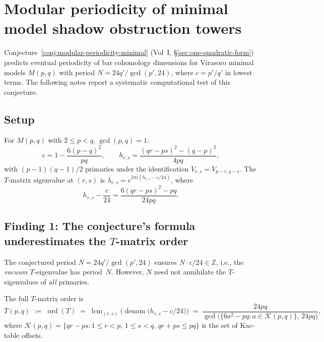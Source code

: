 \documentclass[11pt]{article}
\begin{document}
\section{Modular periodicity of minimal model shadow obstruction towers}
\label{sec:modular-periodicity-minimal-shadow}

Conjecture~\ref*{conj:modular-periodicity-minimal} (Vol~I,
\S\ref*{sec:one-quadratic-form}) predicts eventual periodicity
of bar cohomology dimensions for Virasoro minimal models
$M(p,q)$ with period $N = 24q'/\gcd(p',24)$, where
$c = p'/q'$ in lowest terms.  The following notes report a
systematic computational test of this conjecture.

\subsection*{Setup}

For $M(p,q)$ with $2 \le p < q$, $\gcd(p,q)=1$:
\[
c = 1 - \frac{6(p-q)^2}{pq}, \qquad
h_{r,s} = \frac{(qr-ps)^2 - (q-p)^2}{4pq},
\]
with $(p-1)(q-1)/2$ primaries under the identification
$V_{r,s} = V_{p-r,q-s}$.  The $T$-matrix eigenvalue at
$(r,s)$ is $\lambda_{r,s} = e^{2\pi i (h_{r,s} - c/24)}$,
where
\[
h_{r,s} - \frac{c}{24}
= \frac{6(qr-ps)^2 - pq}{24pq}.
\]

\subsection*{Finding 1: The conjecture's formula underestimates
  the $T$-matrix order}

The conjectured period $N = 24q'/\gcd(p',24)$ ensures
$N \cdot c/24 \in \mathbb{Z}$, i.e., the \emph{vacuum}
$T$-eigenvalue has period~$N$.  However, $N$ need not
annihilate the $T$-eigenvalues of \emph{all} primaries.

The full $T$-matrix order is
\[
T(p,q)
\;:=\; \operatorname{ord}(T)
\;=\; \operatorname{lcm}_{(r,s)}
  \bigl(\operatorname{denom}\bigl(h_{r,s} - c/24\bigr)\bigr)
\;=\; \frac{24pq}{\gcd\bigl(\{6a^2 - pq : a \in \mathcal{K}(p,q)\},\, 24pq\bigr)},
\]
where $\mathcal{K}(p,q) = \{qr - ps : 1 \le r < p,\,
1 \le s < q,\, qr + ps \le pq\}$ is the set of Kac-table
offsets.
\end{document}
